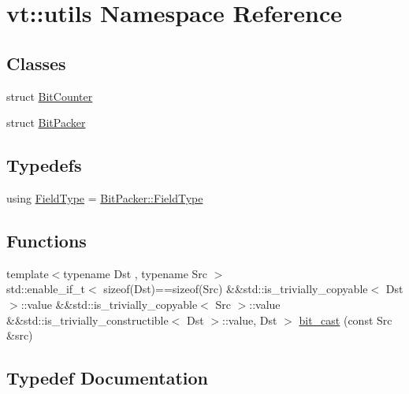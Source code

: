 \hypertarget{namespacevt_1_1utils}{}\section{vt\+:\+:utils Namespace Reference}
\label{namespacevt_1_1utils}
\subsection*{Classes}
\begin{DoxyCompactItemize}
\item 
struct \hyperlink{structvt_1_1utils_1_1_bit_counter}{Bit\+Counter}
\item 
struct \hyperlink{structvt_1_1utils_1_1_bit_packer}{Bit\+Packer}
\end{DoxyCompactItemize}
\subsection*{Typedefs}
\begin{DoxyCompactItemize}
\item 
using \hyperlink{namespacevt_1_1utils_a83bf4339dd1250f9880b6d4603320d39}{Field\+Type} = \hyperlink{structvt_1_1utils_1_1_bit_packer_a23024285425933c1f10c8fc3942f9beb}{Bit\+Packer\+::\+Field\+Type}
\end{DoxyCompactItemize}
\subsection*{Functions}
\begin{DoxyCompactItemize}
\item 
{\footnotesize template$<$typename Dst , typename Src $>$ }\\std\+::enable\+\_\+if\+\_\+t$<$ sizeof(Dst)==sizeof(Src) \&\&std\+::is\+\_\+trivially\+\_\+copyable$<$ Dst $>$\+::value \&\&std\+::is\+\_\+trivially\+\_\+copyable$<$ Src $>$\+::value \&\&std\+::is\+\_\+trivially\+\_\+constructible$<$ Dst $>$\+::value, Dst $>$ \hyperlink{namespacevt_1_1utils_a5aec27f45ff5fd0bacb4b589a100e5be}{bit\+\_\+cast} (const Src \&src)
\end{DoxyCompactItemize}


\subsection{Typedef Documentation}
\mbox{\label{namespacevt_1_1utils_a83bf4339dd1250f9880b6d4603320d39}} 
